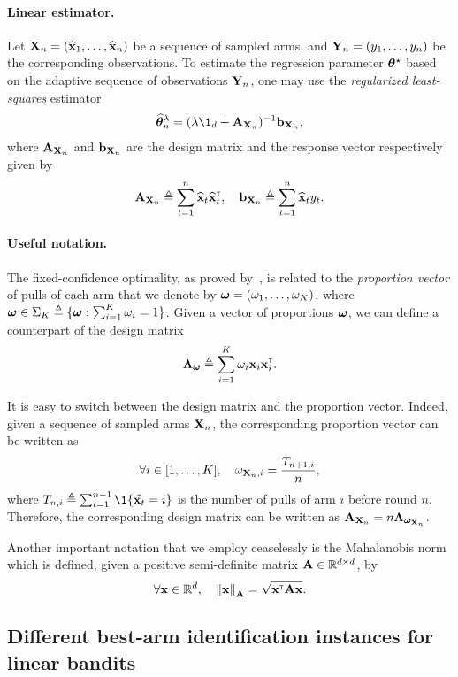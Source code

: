 \paragraph{Linear estimator.}
Let ${\bf X}_n=(\widehat{{\bf x}}_1,\ldots,\widehat{{\bf x}}_n)$ be a sequence of sampled arms, and ${\bf Y}_n=(y_1,\ldots,y_n)$ be the corresponding observations. To estimate the regression parameter ${\boldsymbol \theta}^\star$ based on the adaptive sequence of observations ${\bf Y}_n$, one may use the \emph{regularized least-squares} estimator
\begin{align}\label{eq:update_mean}
    \hat{\btheta}_n^{\lambda} = (\lambda \1_d + \bA_{\bX_n})^{-1}\bb_{\bX_n},
\end{align}
where ${\bf A}_{{\bf X}_n}$ and ${\bf b}_{{\bf X}_n}$ are the design matrix and the response vector respectively given by
\[
    {\bf A}_{{\bf X}_n} \triangleq \sum_{t=1}^n \widehat{{\bf x}}_t\widehat{{\bf x}}_t^\mathsf{\scriptscriptstyle T}, \quad {\bf b}_{{\bf X}_n} \triangleq \sum_{t=1}^n \widehat{{\bf x}}_t y_t.
\]

\paragraph{Useful notation.}
The fixed-confidence optimality, as proved by~\cite{garivier2016tracknstop,russo2016ttts}, is related to the \emph{proportion vector} of pulls of each arm that we denote by ${\boldsymbol \omega} = (\omega_1,\ldots,\omega_K)$, where ${\boldsymbol \omega}\in\Sigma_K \triangleq \{{\boldsymbol \omega} : \sum_{i=1}^K \omega_i = 1\}$. Given a vector of proportions ${\boldsymbol \omega}$, we can define a counterpart of the design matrix 
\[
    {\boldsymbol \Lambda}_{{\boldsymbol \omega}} \triangleq \sum_{i=1}^K \omega_i{\bf x}_i{\bf x}_i^\mathsf{\scriptscriptstyle T}.
\]

It is easy to switch between the design matrix and the proportion vector. Indeed, given a sequence of sampled arms ${\bf X}_n$, the corresponding proportion vector can be written as
\[
    \forall i\in [1,\ldots,K], \quad \omega_{{\bf X}_n,i} = \frac{T_{n+1,i}}{n},
\]
where $T_{n,i} \eqdef \sum_{t=1}^{n-1} \1\{\hat{\bx_t} = i\}$ is the number of pulls of arm $i$ before round $n$. Therefore, the corresponding design matrix can be written as ${\bf A}_{{\bf X}_n}=n{\boldsymbol \Lambda}_{{\boldsymbol \omega}_{{\bf X}_n}}$.

Another important notation that we employ ceaselessly is the Mahalanobis norm which is defined, given a positive semi-definite matrix ${\bf A}\in\mathbb{R}^{d\times d}$, by
\[
    \forall {\bf x}\in\mathbb{R}^d, \quad \left\lVert{\bf x}\right\rVert_{{\bf A}} = \sqrt{{\bf x}^\mathsf{\scriptscriptstyle T}{\bf A}{\bf x}}.
\]

\subsection{Different best-arm identification instances for linear bandits}\label{sec:lgc.formulation.examples}

